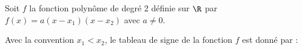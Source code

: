 \begin{Propriete}
    Soit $f$ la fonction polynôme de degré 2 définie sur $\R$ par $f(x)=a(x-x_1)(x-x_2)$ avec $a \neq 0$.
    
    Avec la convention $x_1 < x_2$, le tableau de signe de la fonction $f$ est donné par :
    
    \begin{center}
    \end{center}
\end{Propriete}